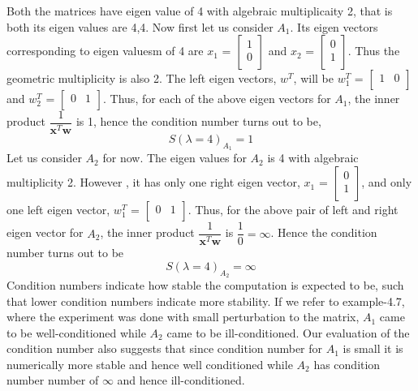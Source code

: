 \documentclass{article}
\begin{document}
Both the matrices have eigen value of 4 with algebraic multiplicaity 2, that is both its eigen values are 4,4. \newline
Now first let us consider $A_{1}$. Its eigen vectors corresponding to eigen valuesm of 4 are \textbf {$x_{1}$} = $\begin{bmatrix} 1 \\ 0 \\ \end{bmatrix}$ and $x_{2}$ = $\begin{bmatrix} 0 \\ 1 \\ \end{bmatrix}$. Thus the geometric multiplicity is also 2. The left eigen vectors, \textbf {$w^T$}, will be $w_{1}^T$ = $\begin{bmatrix} 1 & 0 \\ \end{bmatrix}$ and $w_{2}^T$ = $\begin{bmatrix} 0 & 1 \\ \end{bmatrix}$. \newline
Thus, for each of the above eigen vectors for $A_{1}$, the inner product $\dfrac{1}{\textbf {x}^T\textbf{w}}$ is 1, hence the condition number turns out to be, \newline
\begin{equation}
  S(\lambda = 4)_{A_{1}} = 1
\end{equation}
Let us consider $A_{2}$ for now. The eigen values for $A_{2}$ is 4 with algebraic multiplicity 2. However , it has only one right eigen vector, $x_{1}$ = $\begin{bmatrix} 0 \\ 1 \\ \end{bmatrix}$, and only one left eigen vector, $w_{1}^T$ = $\begin{bmatrix} 0 & 1 \\ \end{bmatrix}$. \newline
Thus, for the above pair of left and right eigen vector for $A_{2}$, the inner product $\dfrac{1}{\textbf {x}^T\textbf{w}}$ is $\dfrac{1}{0} = \infty$. Hence the condition number turns out to be \newline
\begin{equation}
  S(\lambda = 4)_{A_{2}} = \infty
\end{equation}
Condition numbers indicate how stable the computation is expected to be, such that lower condition numbers indicate more stability. If we refer to example-4.7, where the experiment was done with small perturbation to the matrix, $A_{1}$ came to be well-conditioned while $A_{2}$ came to be ill-conditioned. Our evaluation of the condition number also suggests that since condition number for $A_{1}$ is small it is numerically more stable and hence well conditioned while $A_{2}$ has condition number number of $\infty$ and hence ill-conditioned. \newline
\end{document}

